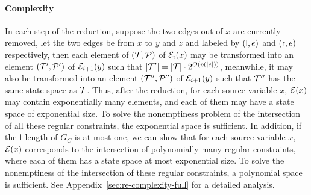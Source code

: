 \paragraph*{Complexity}
In each step of the reduction, suppose the two edges out of $x$ are currently removed, let the two edges be from $x$ to $y$ and $z$ and labeled by $({\sf l}, e)$ and $({\sf r}, e)$ respectively, then each element of $(\mathcal{T}, \mathcal{P})$ of $\mathcal{E}_i(x)$ may be transformed into an element $(\mathcal{T}',\mathcal{P}')$ of $\mathcal{E}_{i+1}(y)$ such that $|\mathcal{T}'| = |\mathcal{T}| \cdot 2^{O(p(|e|))}$, meanwhile, it may also be transformed into an element $(\mathcal{T}'',\mathcal{P}'')$ of $\mathcal{E}_{i+1}(y)$ such that $\mathcal{T}''$ has the same state space as $\mathcal{T}$. Thus, after the reduction, for each source variable $x$, $\mathcal{E}(x)$ may contain exponentially many elements, and each of them may have a state space of exponential size. To solve the nonemptiness problem of the intersection of all these regular constraints, the exponential space is sufficient. In addition, if the $\mathsf{l}$-length of $G_C$ is at most one, we can show that for each source variable $x$,  $\mathcal{E}(x)$ corresponds to the intersection of polynomially many regular constraints, where each of them has a state space at most exponential size. To solve the nonemptiness of the intersection of these regular constraints, a polynomial space is sufficient. See Appendix~\ref{sec:re-complexity-full} for a detailed analysis.



